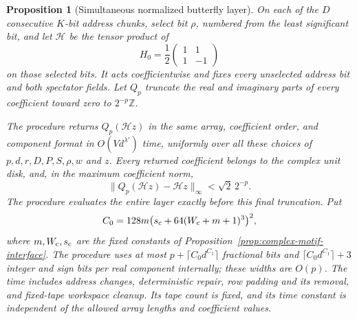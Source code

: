 \documentclass[11pt]{article}
\newtheorem{proposition}[theorem]{Proposition}
\theoremstyle{definition}
\begin{document}
\begin{proposition}[Simultaneous normalized butterfly layer]
On each of the $D$ consecutive $K$-bit address chunks, select bit
$\rho$, numbered from the least significant bit, and let
$\mathcal H$ be the tensor product of
\[
 H_0=\frac12\begin{pmatrix}1&1\\1&-1\end{pmatrix}
\]
on those selected bits. It acts coefficientwise and fixes every
unselected address bit and both spectator fields. Let $Q_p$ truncate
the real and imaginary parts of every coefficient toward zero to
$2^{-p}\mathbb Z$.

The procedure returns $Q_p(\mathcal H z)$ in the same array,
coefficient order, and component format in $O(Vd^{\lambda'})$ time,
uniformly over all these
choices of $p,d,r,D,P,S,\rho,w$ and $z$. Every returned coefficient belongs
to the complex unit disk, and, in the maximum coefficient norm,
\[
 \|Q_p(\mathcal H z)-\mathcal H z\|_\infty
       <\sqrt2\,2^{-p}.
\]
The procedure evaluates the entire layer exactly before this final
truncation. Put
\[
 C_0=128m\bigl(s_{\rm c}+64(W_{\rm c}+m+1)^3\bigr)^2,
\]
where $m,W_{\rm c},s_{\rm c}$ are the fixed constants of
Proposition~\ref{prop:complex-motif-interface}. The procedure uses
at most $p+\lceil C_0d^{C_1}\rceil$ fractional bits and
$\lceil C_0d^{C_1}\rceil+3$ integer and sign bits per real component
internally; these widths are $O(p)$. The time includes address changes,
deterministic repair, row padding and its removal, and fixed-tape
workspace cleanup. Its tape count is fixed, and its time constant is
independent of the allowed array lengths and coefficient values.
\end{proposition}
\end{document}
